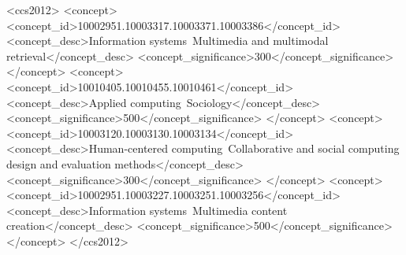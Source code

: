 \documentclass[sigconf]{acmart}
\begin{document}
\begin{CCSXML}
<ccs2012>
   <concept>
       <concept_id>10002951.10003317.10003371.10003386</concept_id>
       <concept_desc>Information systems~Multimedia and multimodal retrieval</concept_desc>
       <concept_significance>300</concept_significance>
       </concept>
   <concept>
       <concept_id>10010405.10010455.10010461</concept_id>
       <concept_desc>Applied computing~Sociology</concept_desc>
       <concept_significance>500</concept_significance>
       </concept>
   <concept>
       <concept_id>10003120.10003130.10003134</concept_id>
       <concept_desc>Human-centered computing~Collaborative and social computing design and evaluation methods</concept_desc>
       <concept_significance>300</concept_significance>
       </concept>
   <concept>
       <concept_id>10002951.10003227.10003251.10003256</concept_id>
       <concept_desc>Information systems~Multimedia content creation</concept_desc>
       <concept_significance>500</concept_significance>
       </concept>
 </ccs2012>
\end{CCSXML}






\end{document}
